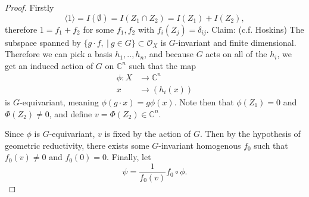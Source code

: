 \documentclass{article}
\theoremstyle{definition}
\theoremstyle{remark}
\numberwithin{theorem}{section}
\newcommand{\C}{\mathbb{C}}
\newcommand{\OO}{\mathcal{O}}
\begin{document}
\begin{proof}
	Firstly
	\begin{equation}
		\langle 1 \rangle = I(\emptyset) = I(Z_1\cap Z_2) = I(Z_1)+I(Z_2),
\end{equation}
therefore $1 = f_1 + f_2$ for some $f_1,f_2$ with $f_i(Z_j)=\delta_{ij}$. Claim: (c.f. Hoskins) The subspace spanned by $\{g\cdot f, ~|~ g\in G\} \subset \OO_X$ is $G$-invariant and finite dimensional. Therefore we can pick a basis $h_1,..,h_n$, and because $G$ acts on all of the $h_i$, we get an induced action of $G$ on $\C^n$ such that the map
\begin{align*}
	\phi:X &\to \C^n\\
	x&\to (h_i(x))
\end{align*}
is $G$-equivariant, meaning $\phi(g\cdot x) = g\phi(x)$.  Note then that $\phi(Z_1)=0$ and $\Phi(Z_2)\neq 0$, and define $v=\Phi(Z_2) \in \C^n$. \vspace{1em}

Since $\phi$ is $G$-equivariant, $v$ is fixed by the action of $G$. Then by the hypothesis of geometric reductivity, there exists some $G$-invariant homogenous $f_0$ such that $f_0(v)\neq 0$ and $f_0(0)=0$. Finally, let 
\begin{equation}
	\psi = \frac{1}{f_0(v)}f_0\circ \phi.
\end{equation}
\end{proof}
\end{document}
